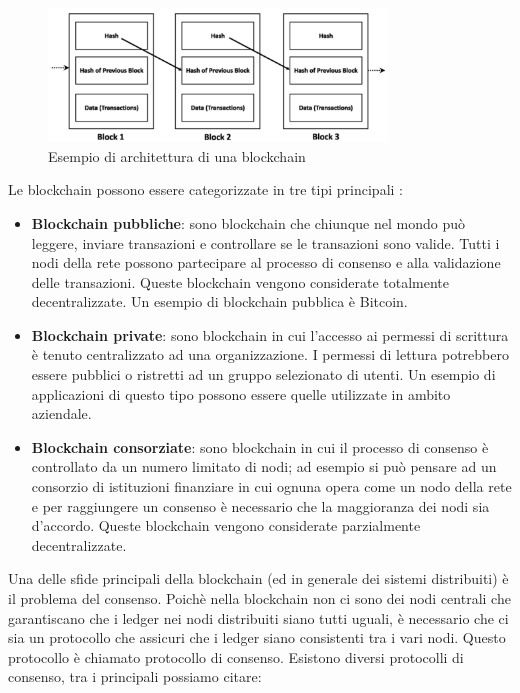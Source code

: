 \documentclass[../../Thesis.tex]{subfiles}
\begin{document}
\begin{figure}[h!]
    \centering
    \includegraphics[width=0.8\textwidth]{../../img/Blockchain.png}
    \caption{Esempio di architettura di una blockchain}
    \label{fig:Blockchain}
\end{figure}
Le blockchain possono essere categorizzate in tre tipi principali \cite{Tassonomia}:
\begin{itemize}
    \item \textbf{Blockchain pubbliche}: sono blockchain che chiunque nel mondo può leggere, inviare transazioni e controllare se le transazioni sono valide. Tutti i nodi della rete possono partecipare al processo di consenso e alla validazione delle transazioni. Queste blockchain vengono considerate totalmente decentralizzate. Un esempio di blockchain pubblica è Bitcoin.
    \item \textbf{Blockchain private}: sono blockchain in cui l'accesso ai permessi di scrittura è tenuto centralizzato ad una organizzazione. I permessi di lettura potrebbero essere pubblici o ristretti ad un gruppo selezionato di utenti. Un esempio di applicazioni di questo tipo possono essere quelle utilizzate in ambito aziendale.
    \item \textbf{Blockchain consorziate}: sono blockchain in cui il processo di consenso è controllato da un numero limitato di nodi; ad esempio si può pensare ad un consorzio di istituzioni finanziare in cui ognuna opera come un nodo della rete e per raggiungere un consenso è necessario che la maggioranza dei nodi sia d'accordo. Queste blockchain vengono considerate parzialmente decentralizzate.
\end{itemize}
Una delle sfide principali della blockchain (ed in generale dei sistemi distribuiti) è il problema del consenso. Poichè nella blockchain non ci sono dei nodi centrali che garantiscano che i ledger nei nodi distribuiti siano tutti uguali, è necessario che ci sia un protocollo che assicuri che i ledger siano consistenti tra i vari nodi. Questo protocollo è chiamato protocollo di consenso. Esistono diversi protocolli di consenso, tra i principali possiamo citare:
\end{document}
